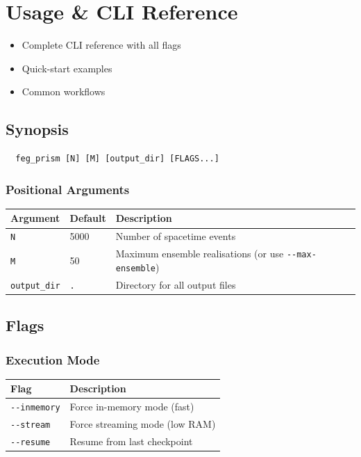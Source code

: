 \documentclass[11pt, a4paper, openany]{book}
\newcommand{\code}[1]{\texttt{#1}}
\newcommand{\flag}[1]{\texttt{-{}-#1}}
\newenvironment{introduction}[1][Chapter Overview]{%
  \begin{tcolorbox}[
    enhanced,colback=structure!5,colframe=structure,
    colbacktitle=structure,coltitle=white,
    fonttitle=\small\bfseries,title={#1},
    arc=2pt,boxrule=0.7pt,
    left=8pt,right=8pt,top=6pt,bottom=6pt,
    before skip=12pt,after skip=12pt
  ]\itshape\begin{itemize}[leftmargin=*,itemsep=2pt,parsep=0pt]
}{%
  \end{itemize}\end{tcolorbox}
}
\begin{document}
\chapter{Usage \& CLI Reference}

\begin{introduction}
  \item Complete CLI reference with all flags
  \item Quick-start examples
  \item Common workflows
\end{introduction}

\section{Synopsis}

\begin{verbatim}
  feg_prism [N] [M] [output_dir] [FLAGS...]
\end{verbatim}

\subsection{Positional Arguments}

\begin{longtable}{llp{8cm}}
  \toprule
  \textbf{Argument} & \textbf{Default} & \textbf{Description} \\
  \midrule
  \code{N}          & 5000   & Number of spacetime events \\
  \code{M}          & 50     & Maximum ensemble realisations (or use \flag{max-ensemble}) \\
  \code{output\_dir} & \code{.} & Directory for all output files \\
  \bottomrule
\end{longtable}

\section{Flags}

\subsection{Execution Mode}

\begin{longtable}{lp{10cm}}
  \toprule
  \textbf{Flag} & \textbf{Description} \\
  \midrule
  \flag{inmemory}  & Force in-memory mode (fast) \\
  \flag{stream}    & Force streaming mode (low RAM) \\
  \flag{resume}    & Resume from last checkpoint \\
  \bottomrule
\end{longtable}
\end{document}
